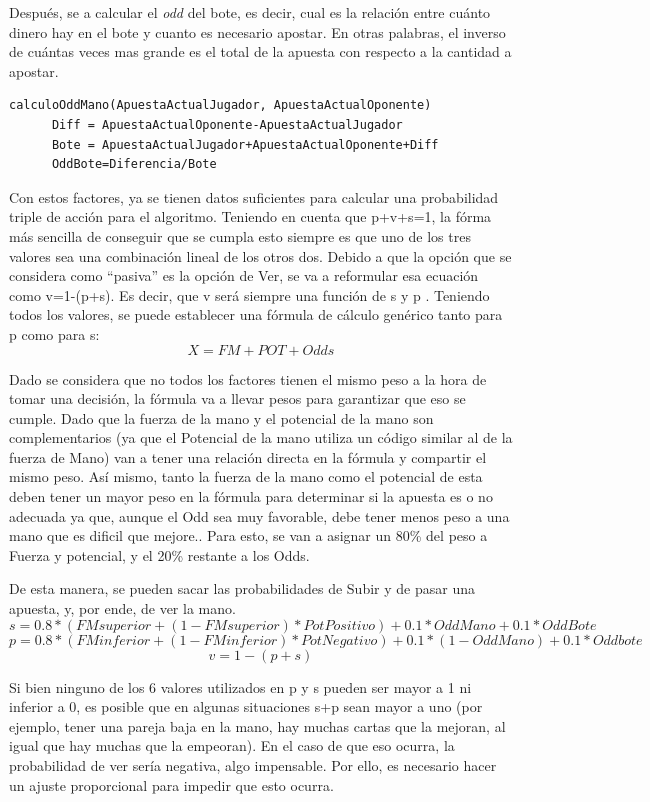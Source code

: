 Después, se a calcular el \textit{odd} del bote, es decir, cual es la relación entre cuánto dinero hay en el bote y cuanto es necesario apostar. En otras palabras, el inverso de cuántas veces mas grande es el total de la apuesta con respecto a la cantidad a apostar.

\begin{verbatim}
calculoOddMano(ApuestaActualJugador, ApuestaActualOponente)
      Diff = ApuestaActualOponente-ApuestaActualJugador
      Bote = ApuestaActualJugador+ApuestaActualOponente+Diff
      OddBote=Diferencia/Bote
\end{verbatim}

Con estos factores, ya se tienen datos suficientes para calcular una probabilidad triple de acción para el algoritmo.
Teniendo en cuenta que p+v+s=1, la fórma más sencilla de conseguir que se cumpla esto siempre es que uno de los tres valores sea una combinación lineal de los otros dos. Debido a que la opción que se considera como “pasiva” es la opción de Ver, se va a reformular esa ecuación como v=1-(p+s). Es decir, que v será siempre una función de s y p
.
Teniendo todos los valores, se puede establecer una fórmula de cálculo genérico tanto para p como para s:
\[
X=FM + POT + Odds
\]


Dado se considera que no todos los factores tienen el mismo peso a la hora de tomar una decisión, la fórmula va a llevar pesos para garantizar que eso se cumple. 
Dado que la fuerza de la mano y el potencial de la mano son complementarios (ya que el Potencial de la mano utiliza un código similar al de la fuerza de Mano) van a tener una relación directa en la fórmula y compartir el mismo peso. Así mismo, tanto la fuerza de la mano como el potencial de esta deben tener un mayor peso en la fórmula para determinar si la apuesta es o no adecuada ya que, aunque el Odd sea muy favorable, debe tener menos peso a una mano que es dificil que mejore.. Para esto, se van a asignar un 80\% del peso a Fuerza y potencial, y el 20\% restante a los Odds.

De esta manera, se pueden sacar las probabilidades de Subir y de pasar una apuesta, y, por ende, de ver la mano.
\[
s= 0.8*(FMsuperior+(1- FMsuperior)*PotPositivo)+0.1*OddMano+0.1*OddBote
\]
\[
p=0.8*(FMinferior+(1-FMinferior)*PotNegativo)+0.1*(1-OddMano)+0.1*Oddbote
\]
\[
v=1-(p+s)
\]

Si bien ninguno de los 6 valores utilizados en p y s pueden ser mayor a 1 ni inferior a 0, es posible que en algunas situaciones s+p sean mayor a uno (por ejemplo, tener una pareja baja en la mano, hay muchas cartas que la mejoran, al igual que hay muchas que la empeoran). En el caso de que eso ocurra, la probabilidad de ver sería negativa, algo impensable. Por ello, es necesario hacer un ajuste proporcional para impedir que esto ocurra.

